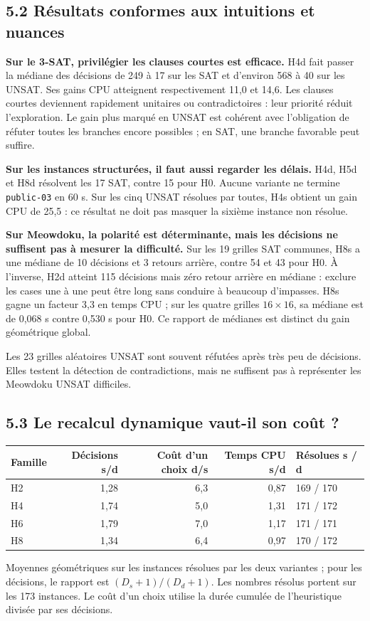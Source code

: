 \documentclass[11pt,a4paper]{article}
\begin{document}
\newpage
\subsection*{5.2 Résultats conformes aux intuitions et nuances}

\textbf{Sur le 3-SAT, privilégier les clauses courtes est efficace.}
H4d fait passer la médiane des décisions de 249 à 17 sur les SAT et
d'environ 568 à 40 sur les UNSAT. Ses gains CPU atteignent respectivement
11,0 et 14,6. Les clauses courtes deviennent rapidement unitaires ou
contradictoires : leur priorité réduit l'exploration. Le gain plus marqué
en UNSAT est cohérent avec l'obligation de réfuter toutes les branches
encore possibles ; en SAT, une branche favorable peut suffire.

\textbf{Sur les instances structurées, il faut aussi regarder les délais.}
H4d, H5d et H8d résolvent les 17 SAT, contre 15 pour H0.
Aucune variante ne termine \texttt{public-03} en 60 s. Sur les cinq
UNSAT résolues par toutes, H4s obtient un gain CPU de 25,5 :
ce résultat ne doit pas masquer la sixième instance non résolue.

\textbf{Sur Meowdoku, la polarité est déterminante, mais les décisions
ne suffisent pas à mesurer la difficulté.}
Sur les 19 grilles SAT communes, H8s a une médiane de 10 décisions et
3 retours arrière, contre 54 et 43 pour H0. À l'inverse, H2d atteint
115 décisions mais zéro retour arrière en médiane : exclure les cases
une à une peut être long sans conduire à beaucoup d'impasses.
H8s gagne un facteur 3,3 en temps CPU ; sur les quatre grilles
$16\times16$, sa médiane est de 0,068 s contre 0,530 s pour H0.
Ce rapport de médianes est distinct du gain géométrique global.

Les 23 grilles aléatoires UNSAT sont souvent réfutées après très peu de
décisions. Elles testent la détection de contradictions, mais ne suffisent
pas à représenter les Meowdoku UNSAT difficiles.

\subsection*{5.3 Le recalcul dynamique vaut-il son coût ?}

\begin{center}
\small
\setlength{\tabcolsep}{8pt}
\begin{tabular}{lrrrl}
\toprule
Famille & Décisions s/d & Coût d'un choix d/s & Temps CPU s/d & Résolues s / d \\
\midrule
H2 & 1,28 & 6,3 & 0,87 & 169 / 170 \\
H4 & 1,74 & 5,0 & 1,31 & 171 / 172 \\
H6 & 1,79 & 7,0 & 1,17 & 171 / 171 \\
H8 & 1,34 & 6,4 & 0,97 & 170 / 172 \\
\bottomrule
\end{tabular}
\end{center}
{\small Moyennes géométriques sur les instances résolues par les deux
variantes ; pour les décisions, le rapport est $(D_s+1)/(D_d+1)$.
Les nombres résolus portent sur les 173 instances. Le coût d'un choix
utilise la durée cumulée de l'heuristique divisée par ses décisions.}
\end{document}
